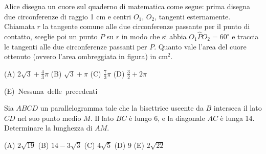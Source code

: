 \begin{esercizio}
    Alice disegna un cuore sul quaderno di matematica come segue: prima disegna due circonferenze di raggio 1 cm e centri
    $O_1$, $O_2$, tangenti esternamente.
    Chiamata $r$ la tangente comune alle due circonferenze passante per il punto di contatto, sceglie poi un punto $P$
    su $r$ in modo che si abbia $O_1\hat{P}O_2 = 60^\circ$ e traccia le tangenti alle due circonferenze passanti per
    $P$.
    Quanto vale l'area del cuore ottenuto (ovvero l'area ombreggiata in figura) in cm$^2$.

    (A) $2\sqrt{3} + \frac{4}{3}\pi$ \quad (B) $\sqrt{3} + \pi$ \quad (C) $\frac{7}{3}\pi$ \quad
    (D) $\frac{3}{2} + 2\pi$ \quad

    (E)~Nessuna~delle~precedenti
\end{esercizio}

\begin{esercizio}
    \label{ex:distrettuale_2023_10}
    Sia $ABCD$ un parallelogramma tale che la bisettrice uscente da $B$ interseca il lato $CD$ nel suo punto medio $M$.
    Il lato $BC$ è lungo 6, e la diagonale $AC$ è lunga 14.
    Determinare la lunghezza di $AM$.

    (A) $2\sqrt {19}$ \quad
    (B) $14 - 3\sqrt{3}$ \quad
    (C) $4\sqrt{5}$ \quad
    (D) $9$ \quad
    (E) $2\sqrt{22}$
\end{esercizio}


